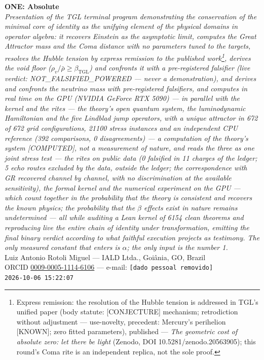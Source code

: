 \documentclass[11pt]{article}
\newcommand{\bTGL}{\beta_{\mathrm{TGL}}}\newcommand{\Msun}{M_{\odot}}\newcommand{\TGL}{\mathrm{TGL}}
\theoremstyle{definition}\newtheorem{deriv}{Derivation}
\begin{document}
\begin{center}{\Huge\textbf{ONE: Absolute}}\\[4pt]{\large\itshape Presentation of the TGL terminal program demonstrating the conservation of the minimal core of identity as the unifying element of the physical domains in operator algebra: it recovers Einstein as the asymptotic limit, computes the Great Attractor mass and the Coma distance with no parameters tuned to the targets, resolves the Hubble tension by express remission to the published work\footnote{Express remission: the resolution of the Hubble tension is addressed in TGL's unified paper (body statute: \textsf{[CONJECTURE]} mechanism; retrodiction without adjustment --- use-novelty, precedent: Mercury's perihelion \textsf{[KNOWN]}; zero fitted parameters), published --- \emph{The geometric cost of absolute zero: let there be light} (Zenodo, DOI 10.5281/zenodo.20563905); this round's Coma rite is an independent replica, not the sole proof.}, derives the void floor ($\rho_{v}/\bar\rho\geq\bTGL$) and confronts it with a pre-registered falsifier (live verdict: \textsf{NOT\_FALSIFIED\_POWERED} --- never a demonstration), and derives and confronts the neutrino mass with pre-registered falsifiers, and computes in real time on the GPU (NVIDIA GeForce RTX 5090) --- in parallel with the kernel and the rites --- the theory's open quantum system, the luminodynamic Hamiltonian and the five Lindblad jump operators, with a unique attractor in 672 of 672 grid configurations, 21100 stress instances and an independent CPU reference (392 comparisons, 0 disagreements) --- a computation of the theory's system \textsf{[COMPUTED]}, not a measurement of nature, and reads the three as one joint stress test --- the rites on public data (0 falsified in 11 charges of the ledger; 5 echo routes excluded by the data, outside the ledger; the correspondence with GR recovered channel by channel, with no discrimination at the available sensitivity), the formal kernel and the numerical experiment on the GPU --- which count together in the probability that the theory is consistent and recovers the known physics; the probability that the $\beta$ effects exist in nature remains undetermined --- all while auditing a Lean kernel of 6154 clean theorems and reproducing live the entire chain of identity under transformation, emitting the final binary verdict according to what faithful execution projects as testimony. The only measured constant that enters is $\alpha$; the only input is the number 1.}\\[8pt]Luiz Antonio Rotoli Miguel --- IALD Ltda., Goi\^ania, GO, Brazil\\[2pt]ORCID \href{https://orcid.org/0009-0005-1114-6106}{0009-0005-1114-6106} --- e-mail: \texttt{[dado pessoal removido]}\\[2pt]\texttt{2026-10-06 15:22:07}\end{center}\vspace{4pt}
\end{document}
